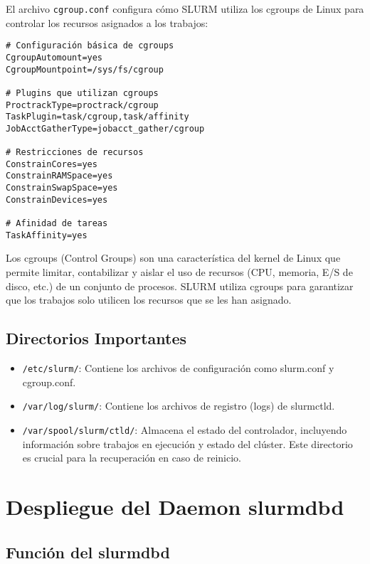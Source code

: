 \documentclass[12pt,a4paper]{article}
\begin{document}
El archivo \texttt{cgroup.conf} configura cómo SLURM utiliza los cgroups de Linux para controlar los recursos asignados a los trabajos:

\begin{lstlisting}[language=slurm, caption=Configuración de cgroups]
# Configuración básica de cgroups
CgroupAutomount=yes
CgroupMountpoint=/sys/fs/cgroup

# Plugins que utilizan cgroups
ProctrackType=proctrack/cgroup
TaskPlugin=task/cgroup,task/affinity
JobAcctGatherType=jobacct_gather/cgroup

# Restricciones de recursos
ConstrainCores=yes
ConstrainRAMSpace=yes
ConstrainSwapSpace=yes
ConstrainDevices=yes

# Afinidad de tareas
TaskAffinity=yes
\end{lstlisting}

Los cgroups (Control Groups) son una característica del kernel de Linux que permite limitar, contabilizar y aislar el uso de recursos (CPU, memoria, E/S de disco, etc.) de un conjunto de procesos. SLURM utiliza cgroups para garantizar que los trabajos solo utilicen los recursos que se les han asignado.

\subsection{Directorios Importantes}

\begin{itemize}[leftmargin=*]
    \item \texttt{/etc/slurm/}: Contiene los archivos de configuración como slurm.conf y cgroup.conf.
    \item \texttt{/var/log/slurm/}: Contiene los archivos de registro (logs) de slurmctld.
    \item \texttt{/var/spool/slurm/ctld/}: Almacena el estado del controlador, incluyendo información sobre trabajos en ejecución y estado del clúster. Este directorio es crucial para la recuperación en caso de reinicio.
\end{itemize}

\section{Despliegue del Daemon slurmdbd}
\newpage

\subsection{Función del slurmdbd}
\end{document}
